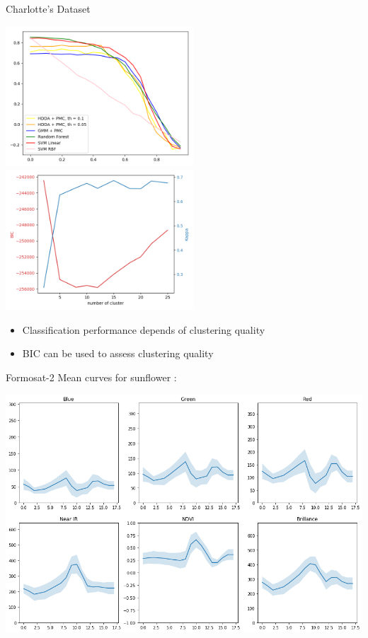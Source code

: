 \documentclass[aspectratio=1610,usenames,dvipsnames]{beamer}
\begin{document}
\begin{frame}{Charlotte's Dataset}
    \begin{center}
        
        \includegraphics[width=7cm]{img/plot_5classes_hdda_multipleth.png}
        \includegraphics[width=7cm]{img/cluster_bic_5class_gmm.png}
    \end{center}
    
    
    \begin{itemize}
        \item Classification performance depends of clustering quality
        \item BIC can be used to assess clustering quality
    \end{itemize}
    
\end{frame}

\begin{frame}{Formosat-2}
    Mean curves for sunflower :
    \begin{center}
    \includegraphics[height=0.8\textheight]{img/tournesol.png}
    \end{center}
\end{frame}
\end{document}
